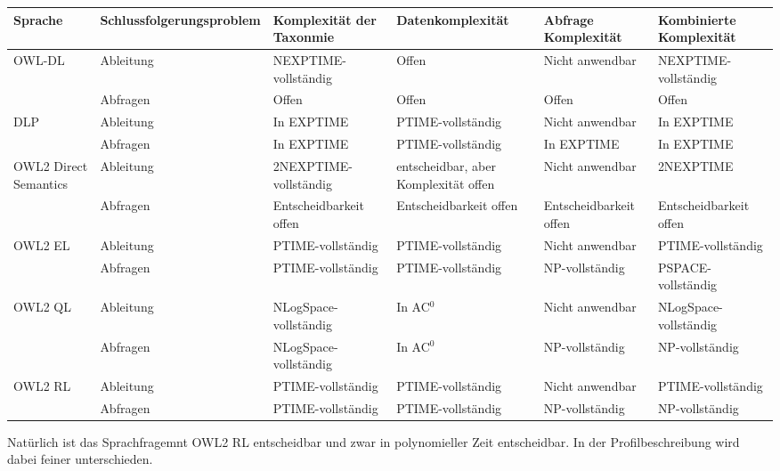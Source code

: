 \begin{table}
	
	\begin{tabular}{|m{1.4cm}|p{2cm}|p{2cm}|p{2cm}|p{2cm}|p{2cm}|}
	\hline
	Sprache & Schlussfolger\-ungs\-problem & Komplexität der Taxonmie & Daten\-komplexität & Abfrage Komplexität & Kombinierte Komplexität \\
	\hline
	\hline
	\multirow{2}{*}{OWL-DL} & Ableitung & NEXPTIME-vollständig & Offen & Nicht anwendbar & NEXPTIME-vollständig \\ \cline{2-6}
		& Abfragen & Offen & Offen & Offen & Offen \\
	\hline
	\multirow{2}{*}{DLP} & Ableitung & In EXPTIME & PTIME-vollständig & Nicht anwendbar & In EXPTIME \\ \cline{2-6}
		& Abfragen & In EXPTIME & PTIME-vollständig & In EXPTIME & In EXPTIME \\
	\hline
	\multirow{2}{*}{OWL2 Direct Semantics} & Ableitung & 2NEXPTIME-vollständig & entscheidbar, aber Komplexität offen & Nicht anwendbar & 2NEXPTIME \\ \cline{2-6}
		& Abfragen & Entscheidbarkeit offen & Entscheidbarkeit offen & Entscheidbarkeit offen & Entscheidbarkeit offen \\
	\hline
	\multirow{2}{*}{OWL2 EL} & Ableitung & PTIME-vollständig & PTIME-vollständig & Nicht anwendbar & PTIME-vollständig \\ \cline{2-6}
		& Abfragen & PTIME-vollständig & PTIME-vollständig & NP-vollständig & PSPACE-vollständig \\
	\hline
	\multirow{2}{*}{OWL2 QL} & Ableitung & NLogSpace-vollständig & In AC$^0$ & Nicht anwendbar & NLogSpace-vollständig \\ \cline{2-6}
		& Abfragen & NLogSpace-vollständig & In AC$^0$ & NP-vollständig & NP-vollständig \\
	\hline
	\multirow{2}{*}{OWL2 RL} & Ableitung & PTIME-vollständig & PTIME-vollständig & Nicht anwendbar & PTIME-vollständig \\ \cline{2-6}
		& Abfragen & PTIME-vollständig & PTIME-vollständig & NP-vollständig & NP-vollständig \\
	\hline
	\end{tabular}
	
	\cite{WebontTractable}
	\cite{OWL2Complexities}
	\cite{ComplexityNavigator}
\end{table}

Natürlich ist das Sprachfragemnt OWL2 RL entscheidbar und zwar in polynomieller Zeit entscheidbar. In der Profilbeschreibung wird dabei feiner unterschieden.


